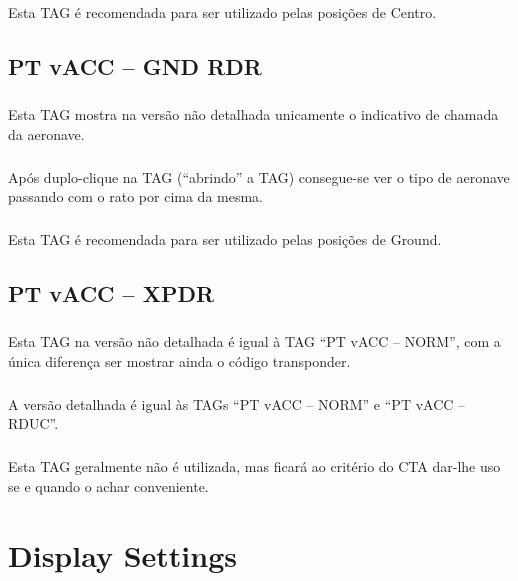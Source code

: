 \documentclass[10pt]{report}
\begin{document}
\paragraph{} Esta TAG é recomendada para ser utilizado pelas posições de Centro.


\section{PT vACC – GND RDR}
\paragraph{} Esta TAG mostra na versão não detalhada unicamente o indicativo de chamada da
aeronave.

\paragraph{} Após duplo-clique na TAG (“abrindo” a TAG) consegue-se ver o tipo de aeronave passando
com o rato por cima da mesma.

\paragraph{} Esta TAG é recomendada para ser utilizado pelas posições de Ground.


\section{PT vACC – XPDR}
\paragraph{} Esta TAG na versão não detalhada é igual à TAG “PT vACC – NORM”, com a única diferença
ser mostrar ainda o código transponder.

\paragraph{} A versão detalhada é igual às TAGs “PT vACC – NORM” e “PT vACC – RDUC”.

\paragraph{} Esta TAG geralmente não é utilizada, mas ficará ao critério do CTA dar-lhe uso se e
quando o achar conveniente.


\chapter{Display Settings}
\end{document}
